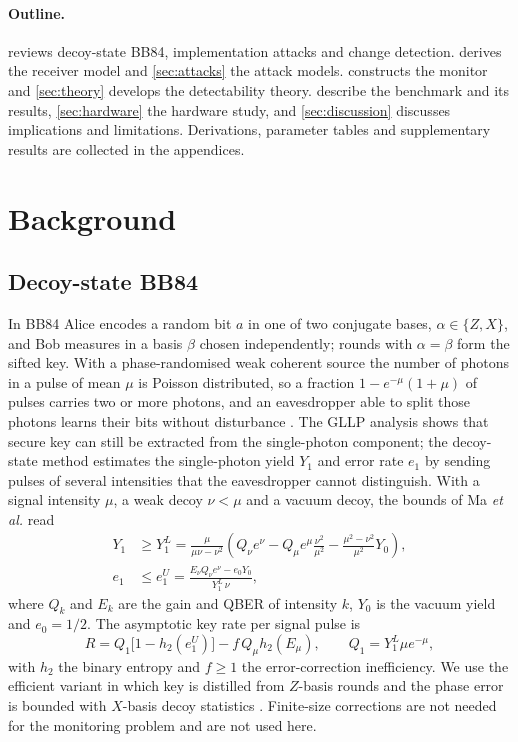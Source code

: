 \documentclass[11pt,a4paper]{article}
\theoremstyle{definition}
\theoremstyle{remark}
\newcommand{\h}{h_2}
\begin{document}
\paragraph{Outline.}  reviews decoy-state BB84, implementation attacks and change detection.  derives the receiver model and \cref{sec:attacks} the attack models.  constructs the monitor and \cref{sec:theory} develops the detectability theory.  describe the benchmark and its results, \cref{sec:hardware} the hardware study, and \cref{sec:discussion} discusses implications and limitations. Derivations, parameter tables and supplementary results are collected in the appendices.

\section{Background}\label{sec:background}

\subsection{Decoy-state BB84}\label{sec:bg-decoy}

In BB84 \cite{BB84} Alice encodes a random bit $a$ in one of two conjugate bases, $\alpha\in\{Z,X\}$, and Bob measures in a basis $\beta$ chosen independently; rounds with $\alpha=\beta$ form the sifted key. With a phase-randomised weak coherent source the number of photons in a pulse of mean $\mu$ is Poisson distributed, so a fraction $1-e^{-\mu}(1+\mu)$ of pulses carries two or more photons, and an eavesdropper able to split those photons learns their bits without disturbance \cite{Brassard2000,Lutkenhaus2000}. The GLLP analysis \cite{GLLP2004} shows that secure key can still be extracted from the single-photon component; the decoy-state method \cite{Hwang2003,LoMaChen2005,Wang2005} estimates the single-photon yield $Y_1$ and error rate $e_1$ by sending pulses of several intensities that the eavesdropper cannot distinguish. With a signal intensity $\mu$, a weak decoy $\nu<\mu$ and a vacuum decoy, the bounds of Ma \emph{et al.} \cite{Ma2005} read
\begin{align}
Y_1 &\ge Y_1^{L} = \frac{\mu}{\mu\nu-\nu^2}\left(Q_\nu e^{\nu} - Q_\mu e^{\mu}\frac{\nu^2}{\mu^2} - \frac{\mu^2-\nu^2}{\mu^2}Y_0\right), \label{eq:y1}\\
e_1 &\le e_1^{U} = \frac{E_\nu Q_\nu e^{\nu} - e_0 Y_0}{Y_1^{L}\,\nu}, \label{eq:e1}
\end{align}
where $Q_k$ and $E_k$ are the gain and QBER of intensity $k$, $Y_0$ is the vacuum yield and $e_0=1/2$. The asymptotic key rate per signal pulse is
\begin{equation}
R = Q_1\bigl[1-\h(e_1^{U})\bigr] - f\,Q_\mu \h(E_\mu),\qquad Q_1 = Y_1^{L}\mu e^{-\mu},\label{eq:rate}
\end{equation}
with $\h$ the binary entropy and $f\ge 1$ the error-correction inefficiency. We use the efficient variant in which key is distilled from $Z$-basis rounds and the phase error is bounded with $X$-basis decoy statistics \cite{LoChauArdehali2005}. Finite-size corrections \cite{Tomamichel2012,Lim2014} are not needed for the monitoring problem and are not used here.
\end{document}
